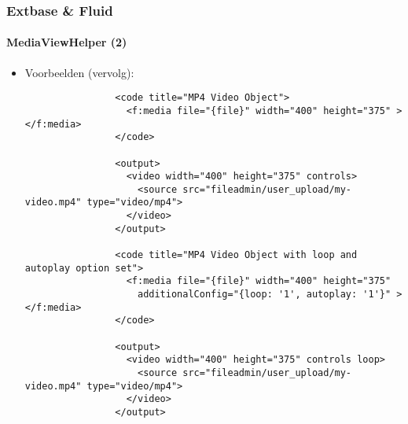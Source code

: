 
\begin{frame}[fragile]
	\frametitle{Extbase \& Fluid}
	\framesubtitle{MediaViewHelper (2)}

	\lstset{basicstyle=\tiny\ttfamily}

	\begin{itemize}

		\item Voorbeelden (vervolg):

			\begin{lstlisting}
				<code title="MP4 Video Object">
				  <f:media file="{file}" width="400" height="375" ></f:media>
				</code>

				<output>
				  <video width="400" height="375" controls>
				    <source src="fileadmin/user_upload/my-video.mp4" type="video/mp4">
				  </video>
				</output>

				<code title="MP4 Video Object with loop and autoplay option set">
				  <f:media file="{file}" width="400" height="375"
				    additionalConfig="{loop: '1', autoplay: '1'}" ></f:media>
				</code>

				<output>
				  <video width="400" height="375" controls loop>
				    <source src="fileadmin/user_upload/my-video.mp4" type="video/mp4">
				  </video>
				</output>
			\end{lstlisting}

	\end{itemize}

\end{frame}


